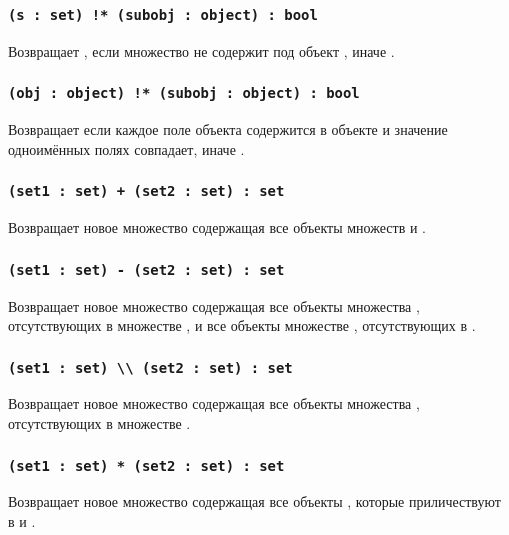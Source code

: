 \subsubsection{\lstinline|(s : set) !* (subobj : object) : bool|}

Возвращает \true{}, если множество  не содержит под объект , иначе \false{}.

\subsubsection{\lstinline|(obj : object) !* (subobj : object) : bool|}

Возвращает \false{} если каждое поле объекта  содержится в объекте  и значение одноимённых полях совпадает, иначе \true{}.

\subsubsection{\lstinline|(set1 : set) + (set2 : set) : set|}

Возвращает новое множество содержащая все объекты множеств  и .

\subsubsection{\lstinline|(set1 : set) - (set2 : set) : set|}

Возвращает новое множество содержащая все объекты множества , отсутствующих в множестве , и все объекты множестве , отсутствующих в .

\subsubsection{\lstinline|(set1 : set) \\ (set2 : set) : set|}

Возвращает новое множество содержащая все объекты множества , отсутствующих в множестве .

\subsubsection{\lstinline|(set1 : set) * (set2 : set) : set|}

Возвращает новое множество содержащая все объекты , которые приличествуют в  и .

